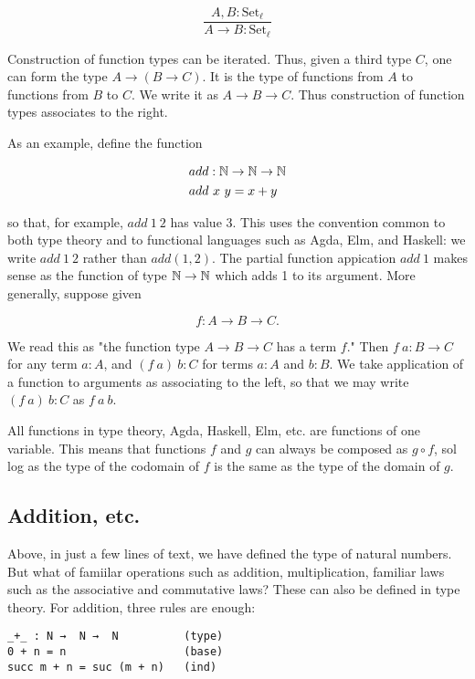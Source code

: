 \begin{equation}
\frac{A, B : \text{Set}_\ell}{A \to B : \text{Set}_\ell}
\end{equation}

Construction of function types can be iterated.  Thus, given a third type $C$, one can form the type  $A \to (B \to C)$.  It is the type of functions from $A$ to functions from $B$ to $C$.  
We write it as $A \to B \to C$. Thus construction of function types associates to the right.

As an example, define the function 

\begin{align}
& add : \mathbb{N} \to \mathbb{N} \to \mathbb{N} \\
& add\ x\ y = x + y
\end{align}

so that, for example, $add\ 1\ 2$ has value 3. This uses the convention common to both type theory and  to functional languages such as Agda, Elm, and Haskell: we write $add\ 1\ 2$ rather than $add(1,2)$.  The partial function appication $add\ 1$  makes sense as the function of type $\mathbb{N} \to \mathbb{N}$ which adds 1 to its argument.  More generally, suppose given

$$
f : A \to B \to C.
$$

We read this as "the function type $A \to B \to C$ has a term $f$."  Then $f\ a : B \to C$ for any term $a : A$, and $(f\ a)\ b : C$ for terms $a: A$ and $b: B$.  We take application of a function to arguments as associating to the left, so that we may write $(f\ a)\ b : C$  as $f\ a\ b$.

All functions in type theory, Agda, Haskell, Elm, etc. are functions of one variable.  This means that functions $f$ and $g$ can always be composed as $g\circ f$, sol log as the type of the codomain of $f$ is the same as the type of the domain of $g$.

\subsection{Addition, etc.}

Above, in just a few lines of text, we have defined  the type of natural numbers.  But what of famiilar operations such as addition, multiplication, familiar laws such as the associative and commutative laws?  These can also be defined in type theory.  For addition, three rules are enough:

\begin{verbatim}
_+_ : N →  N →  N          (type)
0 + n = n                  (base)
succ m + n = suc (m + n)   (ind) 
\end{verbatim}

